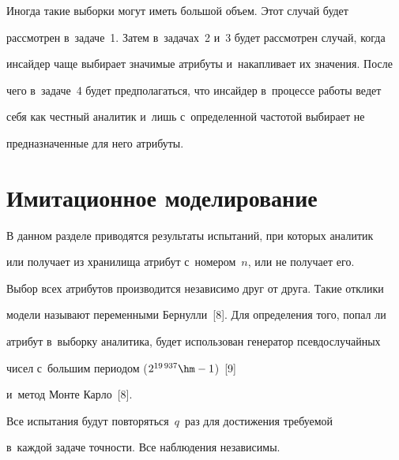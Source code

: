 Иногда такие выборки могут иметь большой объем. Этот случай будет 


рассмотрен в~задаче~1. Затем в~задачах~2 и~3 будет рассмотрен случай, когда 


инсайдер чаще выбирает значимые атрибуты и~накапливает их значения. После 


чего в~задаче~4 будет предполагаться, что инсайдер в~процессе работы ведет 


себя как честный аналитик и~лишь с~определенной частотой выбирает не 


предназначенные для него атрибуты.





\vspace*{-3pt}


  


    \section{Имитационное моделирование}


    


    \vspace*{-3pt}


    


  В данном разделе приводятся результаты испытаний, при которых аналитик 


или получает из хранилища атрибут с~номером~$n$, или не получает его. 


Выбор всех атрибутов производится независимо друг от друга. Такие отклики 


модели называют переменными Бернулли~[8]. Для определения того, попал ли 


атрибут в~выборку аналитика, будет использован генератор псевдослучайных 


чисел с~большим периодом ($2^{19\,937}\hm-1$)~[9] 


  и~метод Мон\-те Кар\-ло~[8].


  


  Все испытания будут повторяться~$q$~раз для достижения требуемой 


в~каждой задаче точности. Все наблюдения независимы.


  


  \smallskip


